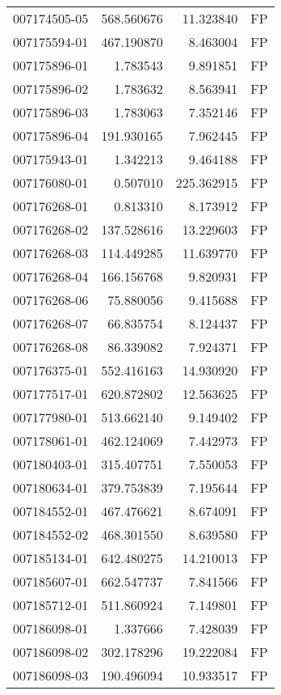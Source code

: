 \begin{tabular}{lrrl}
007174505-05 &  568.560676 &    11.323840 &   FP \\
007175594-01 &  467.190870 &     8.463004 &   FP \\
007175896-01 &    1.783543 &     9.891851 &   FP \\
007175896-02 &    1.783632 &     8.563941 &   FP \\
007175896-03 &    1.783063 &     7.352146 &   FP \\
007175896-04 &  191.930165 &     7.962445 &   FP \\
007175943-01 &    1.342213 &     9.464188 &   FP \\
007176080-01 &    0.507010 &   225.362915 &   FP \\
007176268-01 &    0.813310 &     8.173912 &   FP \\
007176268-02 &  137.528616 &    13.229603 &   FP \\
007176268-03 &  114.449285 &    11.639770 &   FP \\
007176268-04 &  166.156768 &     9.820931 &   FP \\
007176268-06 &   75.880056 &     9.415688 &   FP \\
007176268-07 &   66.835754 &     8.124437 &   FP \\
007176268-08 &   86.339082 &     7.924371 &   FP \\
007176375-01 &  552.416163 &    14.930920 &   FP \\
007177517-01 &  620.872802 &    12.563625 &   FP \\
007177980-01 &  513.662140 &     9.149402 &   FP \\
007178061-01 &  462.124069 &     7.442973 &   FP \\
007180403-01 &  315.407751 &     7.550053 &   FP \\
007180634-01 &  379.753839 &     7.195644 &   FP \\
007184552-01 &  467.476621 &     8.674091 &   FP \\
007184552-02 &  468.301550 &     8.639580 &   FP \\
007185134-01 &  642.480275 &    14.210013 &   FP \\
007185607-01 &  662.547737 &     7.841566 &   FP \\
007185712-01 &  511.860924 &     7.149801 &   FP \\
007186098-01 &    1.337666 &     7.428039 &   FP \\
007186098-02 &  302.178296 &    19.222084 &   FP \\
007186098-03 &  190.496094 &    10.933517 &   FP \\

\end{tabular}
